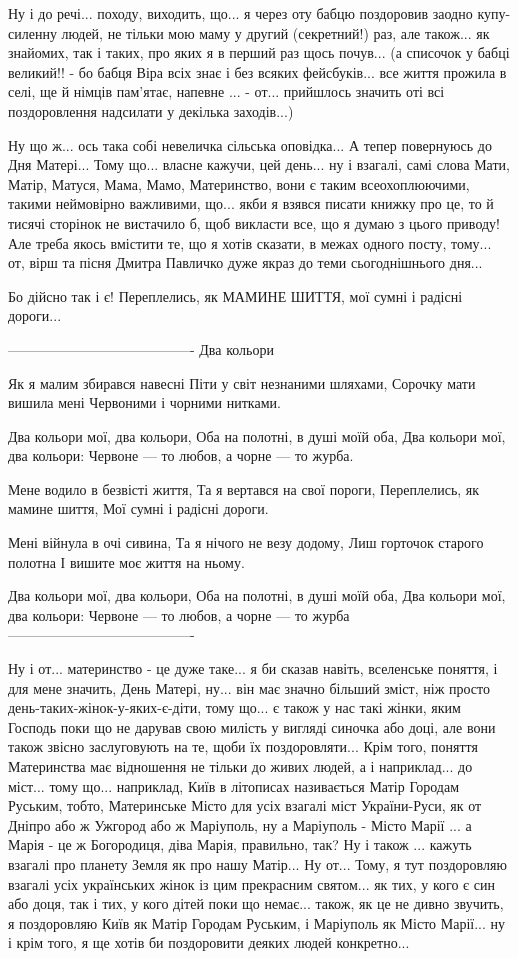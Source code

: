 Ну і до речі... походу, виходить, що... я через оту бабцю поздоровив заодно
купу-силенну людей, не тільки мою маму у другий (секретний!) раз, але також...
як знайомих, так і таких, про яких я в перший раз щось почув...  (а списочок у
бабці великий!! - бо бабця Віра всіх знає і без всяких фейсбуків... все життя
прожила в селі, ще й німців пам'ятає, напевне ... - от... прийшлось значить оті
всі поздоровлення надсилати у декілька заходів...)

Ну що ж... ось така собі невеличка сільська оповідка... А тепер повернуюсь до
Дня Матері...  Тому що... власне кажучи, цей день... ну і взагалі, самі слова
Мати, Матір, Матуся, Мама, Мамо, Материнство, вони є таким всеохоплюючими,
такими неймовірно важливими, що... якби я взявся писати книжку про це, то й
тисячі сторінок не вистачило б, щоб викласти все, що я думаю з цього приводу!
Але треба якось вмістити те, що я хотів сказати, в межах одного посту, тому...
от, вірш та пісня Дмитра Павличко дуже якраз до теми сьогоднішнього дня... 

Бо дійсно так і є! Переплелись, як МАМИНЕ ШИТТЯ, мої сумні і радісні дороги...

----------------------------------------
Два кольори

Як я малим збирався навесні
Піти у світ незнаними шляхами,
Сорочку мати вишила мені
Червоними і чорними нитками.

Два кольори мої, два кольори,
Оба на полотні, в душі моїй оба,
Два кольори мої, два кольори:
Червоне — то любов, а чорне — то журба.

Мене водило в безвісті життя,
Та я вертався на свої пороги,
Переплелись, як мамине шиття,
Мої сумні і радісні дороги.

Мені війнула в очі сивина,
Та я нічого не везу додому,
Лиш горточок старого полотна
І вишите моє життя на ньому.

Два кольори мої, два кольори,
Оба на полотні, в душі моїй оба,
Два кольори мої, два кольори:
Червоне — то любов, а чорне — то журба
----------------------------------------

Ну і от... материнство - це дуже таке... я би сказав навіть, вселенське
поняття, і для мене значить, День Матері, ну... він має значно більший зміст,
ніж просто день-таких-жінок-у-яких-є-діти, тому що... є також у нас такі жінки,
яким Господь поки що не дарував свою милість у вигляді синочка або доці, але
вони також звісно заслуговують на те, щоби їх поздоровляти... Крім того,
поняття Материнства має відношення не тільки до живих людей, а і наприклад...
до міст... тому що... наприклад, Київ в літописах називається Матір Городам
Руським, тобто, Материнське Місто для усіх взагалі міст України-Руси, як от
Дніпро або ж Ужгород або ж Маріуполь, ну а Маріуполь - Місто Марії ... а Марія
- це ж Богородиця, діва Марія, правильно, так? Ну і також ... кажуть взагалі
про планету Земля як про нашу Матір...  Ну от... Тому, я тут поздоровляю
взагалі усіх українських жінок із цим прекрасним святом... як тих, у кого є син
або доця, так і тих, у кого дітей поки що немає...  також, як це не дивно
звучить, я поздоровляю Київ як Матір Городам Руським, і Маріуполь як Місто
Марії...  ну і крім того, я ще хотів би поздоровити деяких людей конкретно...

